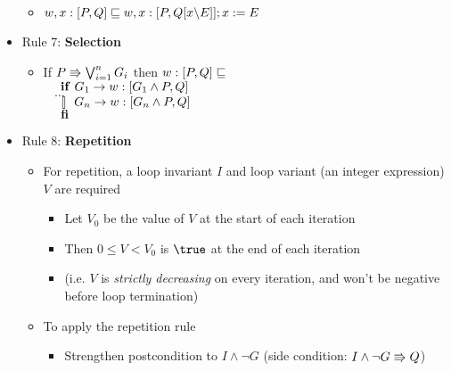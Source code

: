 \begin{itemize}
	\begin{itemize}
	
	\item $ w, x : [P, Q] \mathrel{\sqsubseteq} w, x : [P, Q[x \backslash E]]; x := E $
	
	\end{itemize}

	\item Rule 7: \textbf{Selection}
	
	\begin{itemize}
		
		\item If $ P \Rrightarrow \bigvee_{i=1}^{n} G_i $ then $ w : [P, Q] \mathrel{\sqsubseteq} $\\
		$ ~~~~ {\bf if} ~ G_1 \rightarrow w : [G_1 \land P, Q] $\\
		$ ~~~~ \dots $\\
		$ ~~~~ \mathrel{\tt [\hspace*{-1pt}]} ~ G_n \rightarrow w: [G_n \land P, Q] $\\
		$ ~~~~ {\bf fi} $
		
	\end{itemize}

	\item Rule 8: \textbf{Repetition}
	
	\begin{itemize}
		
		\item For repetition, a loop invariant $ I $ and loop variant (an integer expression) $ V $ are required
		
		\begin{itemize}
			
			\item Let $ V_0 $ be the value of $ V $ at the start of each iteration
			
			\item Then $ 0 \le V < V_0 $ is $ \true $ at the end of each iteration
			
			\item (i.e. $ V $ is \textit{strictly decreasing} on every iteration, and won't be negative before loop termination)
			
		\end{itemize}
	
	\item To apply the repetition rule
	
		\begin{itemize}
			
			\item Strengthen postcondition to $ I \land \lnot G $ (side condition: $ I \land \lnot G \Rrightarrow Q $)
			

\end{itemize}
\end{itemize}
\end{itemize}
